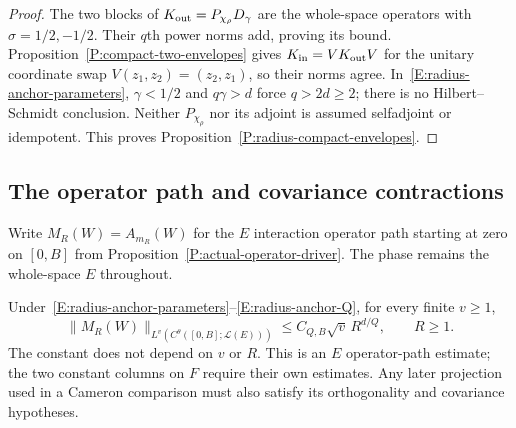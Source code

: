 \begin{proof}
  The two blocks of $K_{\rm out} = P_{\chi_\rho}D_\gamma$ are the whole-space
  operators with $\sigma = 1/2,-1/2$. Their $q$th power norms add, proving its
  bound. Proposition~\ref{P:compact-two-envelopes} gives $K_{\rm in} = V K_{\rm
  out}V$ for the unitary coordinate swap $V(z_1,z_2) = (z_2,z_1)$, so their
  norms agree. In~\eqref{E:radius-anchor-parameters}, $\gamma < 1/2$ and
  $q\gamma > d$ force $q > 2d \ge 2$; there is no Hilbert--Schmidt conclusion.
  Neither $P_{\chi_\rho}$ nor its adjoint is assumed selfadjoint or idempotent.
  This proves Proposition~\ref{P:radius-compact-envelopes}.
\end{proof}

\subsection{The operator path and covariance contractions}

Write $M_R(W) = A_{m_R}(W)$ for the $E$ interaction operator path starting at
zero on $[0,B]$ from Proposition~\ref{P:actual-operator-driver}. The phase
remains the whole-space $E$ throughout.

\begin{proposition}
  \label{P:radius-actual-moments}
  Under~\eqref{E:radius-anchor-parameters}--\eqref{E:radius-anchor-Q}, for every
  finite $v \ge 1$,
  \begin{equation}\label{E:radius-actual-path-moments}
    \|M_R(W)\|_{L^v(C^\theta([0,B];\mathcal{L}(E)))}
    \le C_{Q,B}\sqrt v\,R^{d/Q},\qquad R\ge1.
  \end{equation}
  The constant does not depend on $v$ or $R$. This is an $E$ operator-path
  estimate; the two constant columns on $F$ require their own estimates. Any
  later projection used in a Cameron comparison must also satisfy its
  orthogonality and covariance hypotheses.
\end{proposition}

